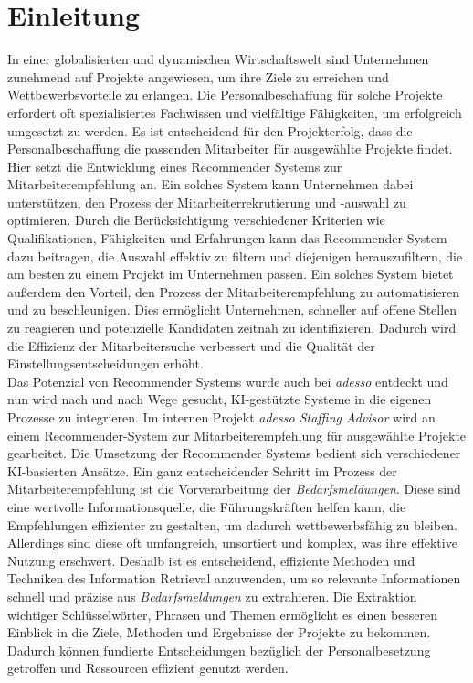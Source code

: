 \chapter{Einleitung}
\label{chap:einleitung}
In einer globalisierten und dynamischen Wirtschaftswelt sind Unternehmen zunehmend auf Projekte angewiesen, um ihre Ziele zu erreichen und Wettbewerbsvorteile zu erlangen. Die Personalbeschaffung für solche Projekte erfordert oft spezialisiertes Fachwissen und vielfältige Fähigkeiten, um erfolgreich umgesetzt zu werden. Es ist entscheidend für den Projekterfolg, dass die Personalbeschaffung die passenden Mitarbeiter für ausgewählte Projekte findet. Hier setzt die Entwicklung eines Recommender Systems zur Mitarbeiterempfehlung an. Ein solches System kann Unternehmen dabei unterstützen, den Prozess der Mitarbeiterrekrutierung und -auswahl zu optimieren. Durch die Berücksichtigung verschiedener Kriterien wie Qualifikationen, Fähigkeiten und Erfahrungen kann das Recommender-System dazu beitragen, die Auswahl effektiv zu filtern und diejenigen herauszufiltern, die am besten zu einem Projekt im Unternehmen passen. Ein solches System bietet außerdem den Vorteil, den Prozess der Mitarbeiterempfehlung zu automatisieren und zu beschleunigen. Dies ermöglicht Unternehmen, schneller auf offene Stellen zu reagieren und potenzielle Kandidaten zeitnah zu identifizieren. Dadurch wird die Effizienz der Mitarbeitersuche verbessert und die Qualität der Einstellungsentscheidungen erhöht.\\

Das Potenzial von Recommender Systems wurde auch bei \emph{adesso} entdeckt und nun wird nach und nach Wege gesucht, KI-gestützte Systeme in die eigenen Prozesse zu integrieren. Im internen Projekt \emph{adesso Staffing Advisor} wird an einem Recommender-System zur Mitarbeiterempfehlung für ausgewählte Projekte gearbeitet. Die Umsetzung der Recommender Systems bedient sich verschiedener KI-basierten Ansätze. Ein ganz entscheidender Schritt im Prozess der Mitarbeiterempfehlung ist die Vorverarbeitung der \emph{Bedarfsmeldungen}. Diese sind eine wertvolle Informationsquelle, die Führungskräften helfen kann, die Empfehlungen effizienter zu gestalten, um dadurch wettbewerbsfähig zu bleiben. Allerdings sind diese oft umfangreich, unsortiert und komplex, was ihre effektive Nutzung erschwert. Deshalb ist es entscheidend, effiziente Methoden und Techniken des Information Retrieval anzuwenden, um so relevante Informationen schnell und präzise aus \emph{Bedarfsmeldungen} zu extrahieren. Die Extraktion wichtiger Schlüsselwörter, Phrasen und Themen ermöglicht es einen besseren Einblick in die Ziele, Methoden und Ergebnisse der Projekte zu bekommen. Dadurch können fundierte Entscheidungen bezüglich der Personalbesetzung getroffen und Ressourcen effizient genutzt werden.\\
